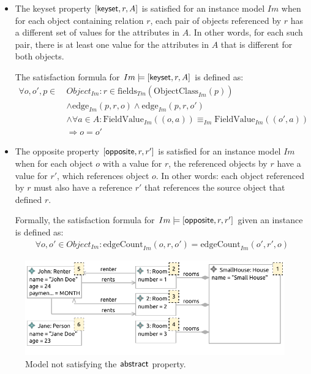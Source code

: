 \begin{defin}
\begin{itemize}
    \item The keyset property $[ \mathsf{keyset}, r, A ]$ is satisfied for an instance model $Im$ when for each object containing relation $r$, each pair of objects referenced by $r$ has a different set of values for the attributes in $A$. In other words, for each such pair, there is at least one value for the attributes in $A$ that is different for both objects.
    
    The satisfaction formula for $Im \models [ \mathsf{keyset}, r, A ]$ is defined as:
    \begin{align*}
        \forall o, o', p \in\ &Object_{Im}\!: r \in \mathrm{fields}_{Tm}(\mathrm{ObjectClass}_{Im}(p))\\&
        \land \mathrm{edge}_{Im}(p, r, o) \land \mathrm{edge}_{Im}(p, r, o')\\&
        \land \forall a \in A\!: \mathrm{FieldValue}_{Im}(( o, a )) \equiv_{Im} \mathrm{FieldValue}_{Im}(( o', a )) \\& \Longrightarrow o = o'
    \end{align*}
    
    \item The opposite property $[ \mathsf{opposite}, r, r' ]$ is satisfied for an instance model $Im$ when for each object $o$ with a value for $r$, the referenced objects by $r$ have a value for $r'$, which references object $o$. In other words: each object referenced by $r$ must also have a reference $r'$ that references the source object that defined $r$.
    
    Formally, the satisfaction formula for $Im \models [ \mathsf{opposite}, r, r' ]$ given an instance is defined as:
    \begin{align*}
        \forall o, o' \in Object_{Im}\!: \mathrm{edgeCount}_{Im}(o, r, o') = \mathrm{edgeCount}_{Im}(o', r', o)
    \end{align*}
\end{itemize}

\end{defin}

\begin{figure}
    \centering
    \includegraphics{images/03_formalisations/02_ecore_formalisation/properties/invalid_abstract.pdf}
    \caption{Model not satisfying the $\mathsf{abstract}$ property.}
    \label{fig:formalisations:ecore_formalisation:instance_models:properties:abstract}
\end{figure}

